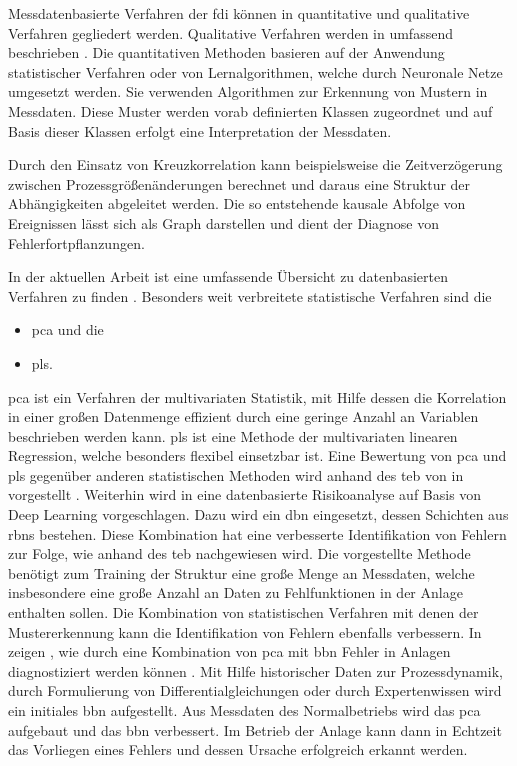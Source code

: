 Messdatenbasierte Verfahren der \ac{fdi} k\"onnen in quantitative und qualitative Verfahren gegliedert werden. Qualitative Verfahren werden in  umfassend beschrieben \cite[S. 2 ff.]{Venkatasubramanian_2003b}. Die quantitativen Methoden basieren auf der Anwendung statistischer Verfahren oder von Lernalgorithmen, welche durch Neuronale Netze umgesetzt werden. Sie verwenden Algorithmen zur Erkennung von Mustern in Messdaten. Diese Muster werden vorab definierten Klassen zugeordnet und auf Basis dieser Klassen erfolgt eine Interpretation der Messdaten.

Durch den Einsatz von Kreuzkorrelation kann beispielsweise die Zeitverz\"ogerung zwischen Prozessgr\"o\ss{}en\"anderungen berechnet und daraus eine Struktur der Abh\"angigkeiten abgeleitet werden. Die so entstehende kausale Abfolge von Ereignissen l\"asst sich als Graph darstellen und dient der Diagnose von Fehlerfortpflanzungen. \cite{Bauer_2008}

In der aktuellen Arbeit  ist eine umfassende \"Ubersicht zu datenbasierten Verfahren zu finden \cite{Zhang_2017}. Besonders weit verbreitete statistische Verfahren sind die \begin{itemize}
\item \ac{pca} und die
\item \ac{pls}.
\end{itemize}
\ac{pca} ist ein Verfahren der multivariaten Statistik, mit Hilfe dessen die Korrelation in einer gro\ss{}en Datenmenge effizient durch eine geringe Anzahl an Variablen beschrieben werden kann. \ac{pls} ist eine Methode der multivariaten linearen Regression, welche besonders flexibel einsetzbar ist. Eine Bewertung von \ac{pca} und \ac{pls} gegen\"uber anderen statistischen Methoden wird anhand des \ac{teb} von \citeauthor{Yin2012} in  vorgestellt \cite{Yin2012}. \newline
Weiterhin wird in \cite{Zhang_2017} eine datenbasierte Risikoanalyse auf Basis von Deep Learning vorgeschlagen. Dazu wird ein \ac{dbn} eingesetzt, dessen Schichten aus \acp{rbn} bestehen. Diese Kombination hat eine verbesserte Identifikation von Fehlern zur Folge, wie anhand des \ac{teb} nachgewiesen wird. Die vorgestellte Methode ben\"otigt zum Training der Struktur eine gro\ss{}e Menge an Messdaten, welche insbesondere eine gro\ss{}e Anzahl an Daten zu Fehlfunktionen in der Anlage enthalten sollen. \newline
Die Kombination von statistischen Verfahren mit denen der Mustererkennung kann die Identifikation von Fehlern ebenfalls verbessern. In  zeigen \citeauthor{Mallick_2013}, wie durch eine Kombination von \ac{pca} mit \ac{bbn} Fehler in Anlagen diagnostiziert werden k\"onnen \cite{Mallick_2013}. Mit Hilfe historischer Daten zur Prozessdynamik, durch Formulierung von Differentialgleichungen oder durch Expertenwissen wird ein initiales \ac{bbn} aufgestellt. Aus Messdaten des Normalbetriebs wird das \ac{pca} aufgebaut und das \ac{bbn} verbessert. Im Betrieb der Anlage kann dann in Echtzeit das Vorliegen eines Fehlers und dessen Ursache erfolgreich erkannt werden. 